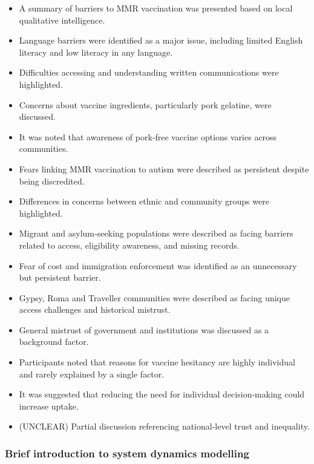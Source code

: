 \documentclass{article}
\begin{document}
\begin{itemize}
    \item A summary of barriers to MMR vaccination was presented based on local qualitative intelligence.
    \item Language barriers were identified as a major issue, including limited English literacy and low literacy in any language.
    \item Difficulties accessing and understanding written communications were highlighted.
    \item Concerns about vaccine ingredients, particularly pork gelatine, were discussed.
    \item It was noted that awareness of pork‑free vaccine options varies across communities.
    \item Fears linking MMR vaccination to autism were described as persistent despite being discredited.
    \item Differences in concerns between ethnic and community groups were highlighted.
    \item Migrant and asylum‑seeking populations were described as facing barriers related to access, eligibility awareness, and missing records.
    \item Fear of cost and immigration enforcement was identified as an unnecessary but persistent barrier.
    \item Gypsy, Roma and Traveller communities were described as facing unique access challenges and historical mistrust.
    \item General mistrust of government and institutions was discussed as a background factor.
    \item Participants noted that reasons for vaccine hesitancy are highly individual and rarely explained by a single factor.
    \item It was suggested that reducing the need for individual decision‑making could increase uptake.
    \item (UNCLEAR) Partial discussion referencing national‑level trust and inequality.
\end{itemize}

\subsubsection{Brief introduction to system dynamics modelling}
\end{document}
